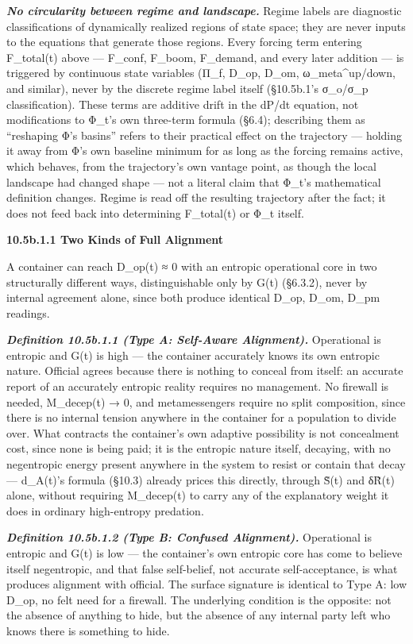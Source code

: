 \documentclass[
]{article}
\begin{document}
\emph{\textbf{No circularity between regime and landscape.}} Regime
labels are diagnostic classifications of dynamically realized regions of
state space; they are never inputs to the equations that generate those
regions. Every forcing term entering F\_total(t) above --- F\_conf,
F\_boom, F\_demand, and every later addition --- is triggered by
continuous state variables (Π\_f, D\_op, D\_om, ω\_meta\^{}up/down, and
similar), never by the discrete regime label itself (§10.5b.1's
σ\_o/σ\_p classification). These terms are additive drift in the dP/dt
equation, not modifications to Φ\_t's own three-term formula (§6.4);
describing them as ``reshaping Φ's basins'' refers to their practical
effect on the trajectory --- holding it away from Φ's own baseline
minimum for as long as the forcing remains active, which behaves, from
the trajectory's own vantage point, as though the local landscape had
changed shape --- not a literal claim that Φ\_t's mathematical
definition changes. Regime is read off the resulting trajectory after
the fact; it does not feed back into determining F\_total(t) or Φ\_t
itself.

\textbf{10.5b.1.1 Two Kinds of Full Alignment}

A container can reach D\_op(t) ≈ 0 with an entropic operational core in
two structurally different ways, distinguishable only by G(t) (§6.3.2),
never by internal agreement alone, since both produce identical D\_op,
D\_om, D\_pm readings.

\emph{\textbf{Definition 10.5b.1.1 (Type A: Self-Aware Alignment).}}
Operational is entropic and G(t) is high --- the container accurately
knows its own entropic nature. Official agrees because there is nothing
to conceal from itself: an accurate report of an accurately entropic
reality requires no management. No firewall is needed, M\_decep(t) → 0,
and metamessengers require no split composition, since there is no
internal tension anywhere in the container for a population to divide
over. What contracts the container's own adaptive possibility is not
concealment cost, since none is being paid; it is the entropic nature
itself, decaying, with no negentropic energy present anywhere in the
system to resist or contain that decay --- d\_A(t)'s formula (§10.3)
already prices this directly, through S̃(t) and δR̃(t) alone, without
requiring M\_decep(t) to carry any of the explanatory weight it does in
ordinary high-entropy predation.

\emph{\textbf{Definition 10.5b.1.2 (Type B: Confused Alignment).}}
Operational is entropic and G(t) is low --- the container's own entropic
core has come to believe itself negentropic, and that false self-belief,
not accurate self-acceptance, is what produces alignment with official.
The surface signature is identical to Type A: low D\_op, no felt need
for a firewall. The underlying condition is the opposite: not the
absence of anything to hide, but the absence of any internal party left
who knows there is something to hide.
\end{document}

